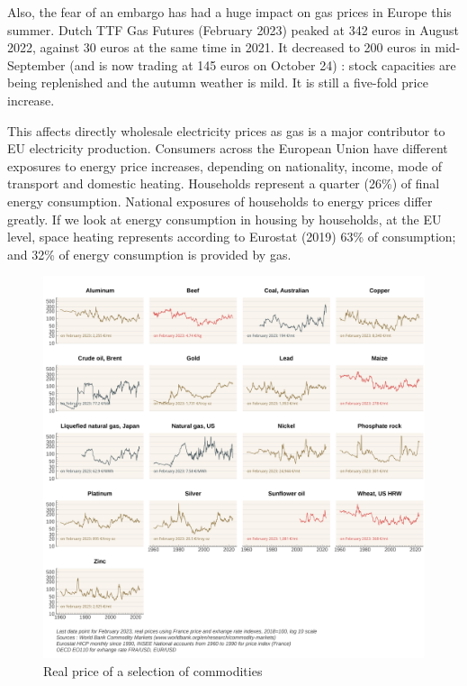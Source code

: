 \documentclass[
  9pt,
  a4paper,
  numbers=noendperiod,
  DIV=12]{scrartcl}
\begin{document}
Also, the fear of an embargo has had a huge impact on gas prices in
Europe this summer. Dutch TTF Gas Futures (February 2023) peaked at 342
euros in August 2022, against 30 euros at the same time in 2021. It
decreased to 200 euros in mid-September (and is now trading at 145 euros
on October 24) : stock capacities are being replenished and the autumn
weather is mild. It is still a five-fold price increase.

This affects directly wholesale electricity prices as gas is a major
contributor to EU electricity production. Consumers across the European
Union have different exposures to energy price increases, depending on
nationality, income, mode of transport and domestic heating. Households
represent a quarter (26\%) of final energy consumption. National
exposures of households to energy prices differ greatly. If we look at
energy consumption in housing by households, at the EU level, space
heating represents according to Eurostat (2019) 63\% of consumption; and
32\% of energy consumption is provided by gas.

\begin{figure}[htb]

\caption{\label{fig-com}Real price of a selection of commodities}

{\centering \includegraphics[width=1\textwidth,height=\textheight]{SIWU_brief_files/figure-pdf/fig-com-1.png}

}

\end{figure}
\end{document}
